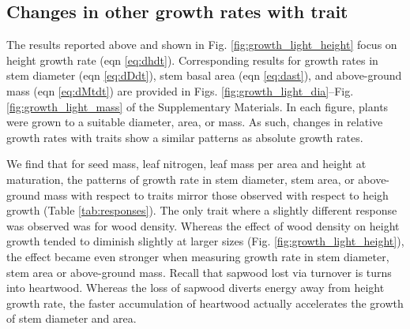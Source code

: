 \documentclass[a4paper,11pt]{article}
\begin{document}

\subsection{Changes in other growth rates with trait}

The results reported above and shown in Fig. \ref{fig:growth_light_height} focus on height growth rate (eqn \ref{eq:dhdt}). Corresponding results for growth rates in stem diameter (eqn \ref{eq:dDdt}), stem basal area (eqn \ref{eq:dast}), and above-ground mass (eqn \ref{eq:dMtdt}) are provided in Figs. \ref{fig:growth_light_dia}--Fig. \ref{fig:growth_light_mass} of the Supplementary Materials. In each figure, plants were grown to a suitable diameter, area, or mass. As such, changes in relative growth rates with traits show a similar patterns as absolute growth rates.

We find that for seed mass, leaf nitrogen, leaf mass per area and height at maturation, the patterns of growth rate in stem diameter, stem area, or above-ground mass with respect to traits mirror those observed with respect to heigh growth (Table \ref{tab:responses}). The only trait where a slightly different response was observed was for wood density. Whereas the effect of wood density on height growth tended to diminish slightly at larger sizes (Fig. \ref{fig:growth_light_height}), the effect became even stronger when measuring growth rate in stem diameter, stem area or above-ground mass. Recall that sapwood lost via turnover is turns into heartwood. Whereas the loss of sapwood diverts energy away from height growth rate, the faster accumulation of heartwood actually accelerates the growth of stem diameter and area.
\end{document}
